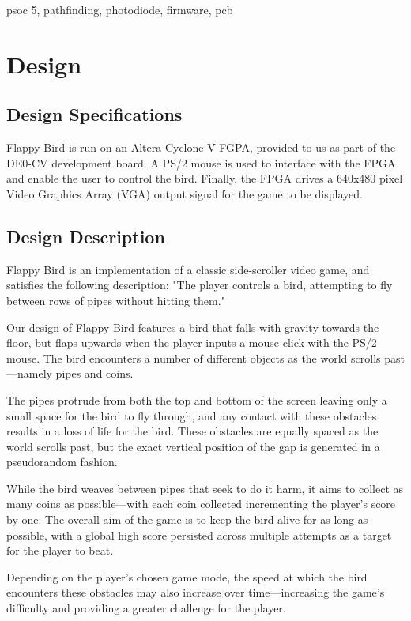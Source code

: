\documentclass[conference]{IEEEtran}
\begin{document}
\begin{IEEEkeywords}
	psoc 5, pathfinding, photodiode, firmware, pcb
\end{IEEEkeywords}

\section{Design}

\subsection{Design Specifications}

Flappy Bird is run on an Altera Cyclone V FGPA, provided to us as part of the DE0-CV development board. A PS/2 mouse is used to interface with the FPGA and enable the user to control the bird. Finally, the FPGA drives a 640x480 pixel Video Graphics Array (VGA) output signal for the game to be displayed.

\subsection{Design Description}

Flappy Bird is an implementation of a classic side-scroller video game, and satisfies the following description: "The player controls a bird, attempting to fly between rows of pipes without hitting them."

Our design of Flappy Bird features a bird that falls with gravity towards the floor, but flaps upwards when the player inputs a mouse click with the PS/2 mouse. The bird encounters a number of different objects as the world scrolls past—namely pipes and coins.

The pipes protrude from both the top and bottom of the screen leaving only a small space for the bird to fly through, and any contact with these obstacles results in a loss of life for the bird. These obstacles are equally spaced as the world scrolls past, but the exact vertical position of the gap is generated in a pseudorandom fashion.

While the bird weaves between pipes that seek to do it harm, it aims to collect as many coins as possible—with each coin collected incrementing the player's score by one. The overall aim of the game is to keep the bird alive for as long as possible, with a global high score persisted across multiple attempts as a target for the player to beat.

Depending on the player's chosen game mode, the speed at which the bird encounters these obstacles may also increase over time—increasing the game's difficulty and providing a greater challenge for the player.
\end{document}
